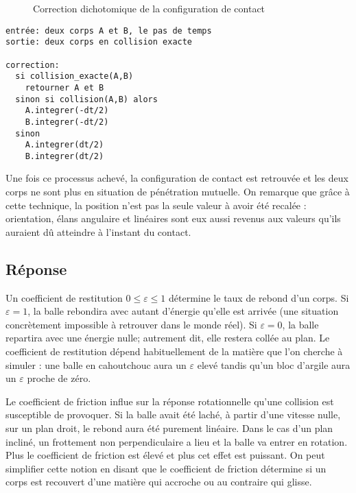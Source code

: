 \begin{figure}
  \centering
  
  \caption{Correction dichotomique de la configuration de contact}
  \label{dichotomie}
\end{figure}

\begin{verbatim}
entrée: deux corps A et B, le pas de temps
sortie: deux corps en collision exacte

correction:
  si collision_exacte(A,B)
    retourner A et B
  sinon si collision(A,B) alors
    A.integrer(-dt/2)
    B.integrer(-dt/2)
  sinon
    A.integrer(dt/2)
    B.integrer(dt/2)

\end{verbatim}

Une fois ce processus achevé, la configuration de contact est
retrouvée et les deux corps ne sont plus en situation de pénétration
mutuelle. On remarque que grâce à cette technique, la position n'est
pas la seule valeur à avoir été recalée : orientation, élans angulaire
et linéaires sont eux aussi revenus aux valeurs qu'ils auraient dû
atteindre à l'instant du contact.

\subsection{Réponse}

Un coefficient de restitution $0 \leq \varepsilon \leq 1$ détermine le
taux de rebond d'un corps. Si $\varepsilon = 1$, la balle rebondira
avec autant d'énergie qu'elle est arrivée (une situation concrètement
impossible à retrouver dans le monde réel). Si $\varepsilon = 0$, la
balle repartira avec une énergie nulle; autrement dit, elle restera
collée au plan. Le coefficient de restitution dépend habituellement de
la matière que l'on cherche à simuler : une balle en cahoutchouc aura
un $\varepsilon$ elevé tandis qu'un bloc d'argile aura un
$\varepsilon$ proche de zéro.

Le coefficient de friction influe sur la réponse rotationnelle qu'une
collision est susceptible de provoquer. Si la balle avait été laché, à
partir d'une vitesse nulle, sur un plan droit, le rebond aura été
purement linéaire. Dans le cas d'un plan incliné, un frottement non
perpendiculaire a lieu et la balle va entrer en rotation. Plus le
coefficient de friction est élevé et plus cet effet est puissant. On
peut simplifier cette notion en disant que le coefficient de friction
détermine si un corps est recouvert d'une matière qui accroche ou au
contraire qui glisse.

\cite{newton87}

